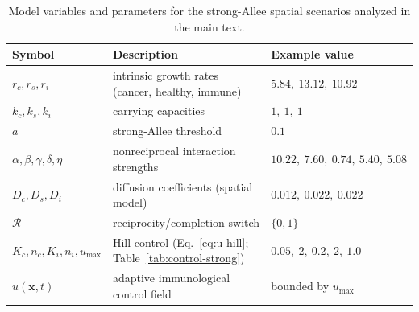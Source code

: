 \begin{table}[!htbp]
\centering
\begin{tabular}{lll}
\toprule
Symbol & Description & Example value \\
\midrule
$r_c,r_s,r_i$ & intrinsic growth rates (cancer, healthy, immune) & $5.84,\ 13.12,\ 10.92$ \\
$k_c,k_s,k_i$ & carrying capacities & $1,\ 1,\ 1$ \\
$a$ & strong-Allee threshold & $0.1$ \\
$\alpha,\beta,\gamma,\delta,\eta$ & nonreciprocal interaction strengths & $10.22,\ 7.60,\ 0.74,\ 5.40,\ 5.08$ \\
$D_c,D_s,D_i$ & diffusion coefficients (spatial model) & $0.012,\ 0.022,\ 0.022$ \\
$\mathcal{R}$ & reciprocity/completion switch & $\{0,1\}$ \\
$K_c,n_c,K_i,n_i,u_{\max}$ & Hill control (Eq.~\eqref{eq:u-hill}; Table~\ref{tab:control-strong}) & $0.05,\ 2,\ 0.2,\ 2,\ 1.0$ \\
$u(\mathbf{x},t)$ & adaptive immunological control field & bounded by $u_{\max}$ \\
\bottomrule
\end{tabular}
\caption{Model variables and parameters for the strong-Allee spatial scenarios analyzed in the main text.}
\label{tab:params}
\end{table}
